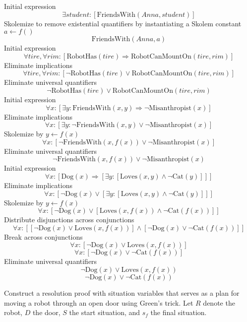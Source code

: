 \documentclass[11pt,largemargins, anonymous]{homework}
\begin{document}
\begin{arabicparts}
    \questionpart
        Initial expression
        \[ \exists student: [\mathrm{FriendsWith}(Anna, student)] \]
        Skolemize to remove existential quantifiers by instantiating a Skolem constant \( a \leftarrow f() \)
        \[ \mathrm{FriendsWith}(Anna, a) \]
    \questionpart
        Initial expression
        \[ \forall tire, \forall rim: [\mathrm{RobotHas}(tire) \Rightarrow \mathrm{RobotCanMountOn}(tire, rim)] \]
        Eliminate implications
        \[ \forall tire, \forall rim: [\neg \mathrm{RobotHas}(tire) \lor \mathrm{RobotCanMountOn}(tire, rim)] \]
        Eliminate universal quantifiers
        \[ \neg \mathrm{RobotHas}(tire) \lor \mathrm{RobotCanMountOn}(tire, rim) \]
    \questionpart
        Initial expression
        \[ \forall x: [\exists y: \mathrm{FriendsWith}(x, y) \Rightarrow \neg \mathrm{Misanthropist}(x)] \]
        Eliminate implications
        \[ \forall x: [\exists y: \neg \mathrm{FriendsWith}(x, y) \lor \neg \mathrm{Misanthropist}(x)] \]
        Skolemize by \( y \leftarrow f(x) \)
        \[ \forall x: [\neg \mathrm{FriendsWith}(x, f(x)) \lor \neg \mathrm{Misanthropist}(x)] \]
        Eliminate universal quantifiers
        \[ \neg \mathrm{FriendsWith}(x, f(x)) \lor \neg \mathrm{Misanthropist}(x) \]
    \questionpart
        Initial expression
        \[ \forall x: [\mathrm{Dog}(x) \Rightarrow [\exists y: [ \mathrm{Loves}(x, y) \land \neg \mathrm{Cat}(y) ] ] ] \]
        Eliminate implications
        \[ \forall x: [\neg \mathrm{Dog}(x) \lor [\exists y: [ \mathrm{Loves}(x, y) \land \neg \mathrm{Cat}(y) ] ] ] \]
        Skolemize by \( y \leftarrow f(x) \)
        \[ \forall x: [\neg \mathrm{Dog}(x) \lor [ \mathrm{Loves}(x, f(x)) \land \neg \mathrm{Cat}(f(x)) ] ] \]
        Distribute disjunctions across conjunctions
        \[ \forall x: [ [\neg \mathrm{Dog}(x) \lor \mathrm{Loves}(x, f(x))] \land [ \neg \mathrm{Dog}(x) \lor \neg \mathrm{Cat}(f(x)) ] ] \]
        Break across conjunctions
        \[ \forall x: [\neg \mathrm{Dog}(x) \lor \mathrm{Loves}(x, f(x)) ] \]
        \[ \forall x: [ \neg \mathrm{Dog}(x) \lor \neg \mathrm{Cat}(f(x)) ] \]
        Eliminate universal quantifiers
        \[ \neg \mathrm{Dog}(x) \lor \mathrm{Loves}(x, f(x)) \]
        \[ \neg \mathrm{Dog}(x) \lor \neg \mathrm{Cat}(f(x)) \]

\end{arabicparts}

\question

Construct a resolution proof with situation variables that serves as a plan
for moving a robot through an open door using Green's trick.
Let $R$ denote the robot, $D$ the door, $S$ the start situation, and $s_f$ the final situation.
\end{document}
